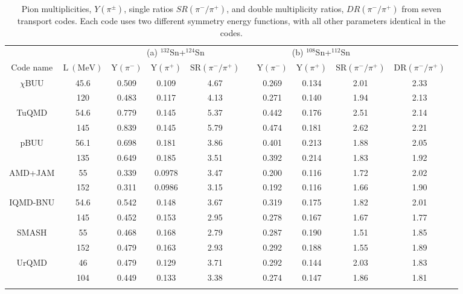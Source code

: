 \begin{table*}[!htb]
\centering
{}
\begin{tabular}{@{}ccccccccccc@{}}
\toprule
        &  & \multicolumn{3}{c}{(a) $^{132}$Sn+$^{124}$Sn} &  & \multicolumn{3}{c}{(b) $^{108}$Sn+$^{112}$Sn} &  \\
        \cmidrule{3-5} \cmidrule{7-9} 
        Code name & $\mathrm{L~(MeV)}$ &  $\mathrm{Y}(\pi^-)$ & $\mathrm{Y}(\pi^+)$ & $\mathrm{SR}(\pi^-/\pi^+)$ &  & $\mathrm{Y}(\pi^-)$  & $\mathrm{Y}(\pi^+)$ & $\mathrm{SR}(\pi^-/\pi^+)$ &  $\mathrm{DR}(\pi^-/\pi^+)$ \\
    \midrule
        $\chi$BUU& 45.6 & 0.509 & 0.109 & 4.67 & & 0.269 & 0.134 & 2.01 & 2.33 \\
        & 120 & 0.483 & 0.117 & 4.13 &  & 0.271 & 0.140 & 1.94 & 2.13 \\
        \addlinespace[0.2cm]
        TuQMD & 54.6 & 0.779 & 0.145 & 5.37 &  & 0.442 & 0.176 & 2.51 & 2.14 \\
        & 145 & 0.839 & 0.145 & 5.79  &  & 0.474 & 0.181 & 2.62 & 2.21 \\
        \addlinespace[0.2cm]
        pBUU & 56.1 & 0.698 & 0.181 & 3.86 &  & 0.401 & 0.213 & 1.88 & 2.05 \\
        & 135 & 0.649 & 0.185 & 3.51  &   & 0.392 & 0.214 & 1.83 & 1.92 \\
        \addlinespace[0.2cm]
        AMD+JAM& 55 & 0.339 & 0.0978 & 3.47 &  & 0.200 & 0.116 & 1.72 & 2.02 \\
        & 152 & 0.311 & 0.0986 & 3.15 &  & 0.192 & 0.116 & 1.66 & 1.90 \\
        \addlinespace[0.2cm]
        IQMD-BNU & 54.6 & 0.542 & 0.148 & 3.67 &  & 0.319 & 0.175 & 1.82 & 2.01 \\
        & 145 & 0.452 & 0.153 & 2.95 &  & 0.278 & 0.167 & 1.67 & 1.77 \\
        \addlinespace[0.2cm]
        SMASH  & 55 & 0.468 & 0.168 & 2.79  &  & 0.287 & 0.190 & 1.51 & 1.85 \\
        & 152 & 0.479 & 0.163 & 2.93 &  & 0.292 & 0.188 & 1.55 & 1.89 \\
        \addlinespace[0.2cm]
        UrQMD & 46 & 0.479 & 0.129 & 3.71 &  & 0.292 & 0.144 & 2.03 & 1.83 \\
        & 104 & 0.449 & 0.133 & 3.38 &  & 0.274 & 0.147 & 1.86 & 1.81 \\
        \addlinespace[0.2cm]
        \bottomrule
    \end{tabular}
    \caption{Pion multiplicities, $Y(\pi^{\pm})$, single ratios $SR(\pi^-/\pi^+)$, and double multiplicity ratios, $DR(\pi^-/\pi^+)$ from seven transport codes. Each code uses two different symmetry energy functions, with all other parameters identical in the codes.}
    \label{tab:pionyieldTheory}
\end{table*}


